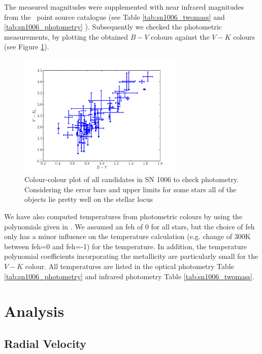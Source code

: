 The measured magnitudes were supplemented with near infrared magnitudes from the \twomass\ point source catalogue (see Table \ref{tab:sn1006_twomass} and \ref{tab:sn1006_photometry} ). Subsequently we checked the photometric measurements, by plotting the obtained $B-V$ colours against the $V-K$ colours (see Figure \ref{fig:colour_check}).
\begin{figure}[htbp] %
   \centering
   \includegraphics[width=0.7\textwidth]{chapter_sn1006/plots/color_bv_vk.pdf} 
   \caption[Colour-colour plot of all candidates in SN 1006 to check photometry]{Colour-colour plot of all candidates in SN 1006 to check photometry. Considering the error bars and upper limits for some stars all of the objects lie pretty well on the stellar locus}
   \label{fig:colour_check}
\end{figure}

We have also computed temperatures from photometric colours by using the polynomials given in \citet{2010A&A...512A..54C}. We assumed an \gls{feh} of 0 for all stars, but the choice of \gls{feh} only has a minor influence on the temperature calculation (e.g. change of 300K between \gls{feh}=0 and \gls{feh}=-1) for the temperature. In addition, the temperature polynomial coefficients incorporating the metallicity are particularly small for the $V-K$ colour. All temperatures are listed in the optical photometry Table \ref{tab:sn1006_photometry} and infrared photometry Table \ref{tab:sn1006_twomass}.


\section{Analysis}
\label{sec:sn1006_analysis}
\subsection{Radial Velocity}

